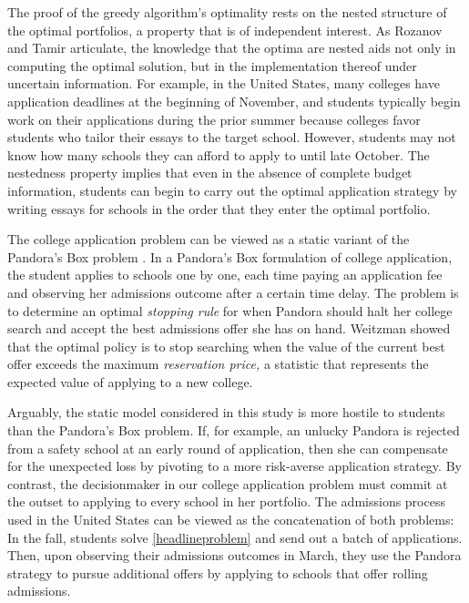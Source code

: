 The proof of the greedy algorithm's optimality rests on the nested structure of the optimal portfolios, a property that is of independent interest. As Rozanov and Tamir \cite{rozanovandtamir2020} articulate, the knowledge that the optima are nested aids not only in computing the optimal solution, but in the implementation thereof under uncertain information. For example, in the United States, many colleges have application deadlines at the beginning of November, and students typically begin work on their applications during the prior summer because colleges favor students who tailor their essays to the target school. However, students may not know how many schools they can afford to apply to until late October. The nestedness property implies that even in the absence of complete budget information, students can begin to carry out the optimal application strategy by writing essays for schools in the order that they enter the optimal portfolio.

The college application problem can be viewed as a static variant of the Pandora's Box problem \cite{weitzman1979,boodaghiansetal2022}. In a Pandora's Box formulation of college application, the student applies to schools one by one, each time paying an application fee and observing her admissions outcome after a certain time delay. The problem is to determine an optimal \emph{stopping rule} for when Pandora should halt her college search and accept the best admissions offer she has on hand. Weitzman \cite{weitzman1979} showed that the optimal policy is to stop searching when the value of the current best offer exceeds the maximum \emph{reservation price,} a statistic that represents the expected value of applying to a new college.

Arguably, the static model considered in this study is more hostile to students than the Pandora's Box problem. If, for example, an unlucky Pandora is rejected from a safety school at an early round of application, then she can compensate for the unexpected loss by pivoting to a more risk-averse application strategy. By contrast, the decisionmaker in our college application problem must commit at the outset to applying to every school in her portfolio. The admissions process used in the United States can be viewed as the concatenation of both problems: In the fall, students solve \eqref{headlineproblem} and send out a batch of applications. Then, upon observing their admissions outcomes in March, they use the Pandora strategy to pursue additional offers by applying to schools that offer rolling admissions.

